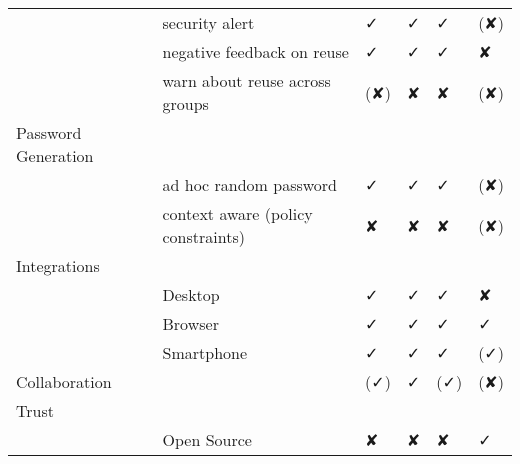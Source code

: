\begin{table}[htbp]
{\begin{tabular}{rlllll}
	& security alert & ✓ & ✓ & ✓ & (✘) \\
	& negative feedback on reuse & ✓ & \textcolor[rgb]{ 1,  0,  0}{✓} & \textcolor[rgb]{ 1,  0,  0}{✓} & ✘\\
	& warn about reuse across groups & (✘)   & \textcolor[rgb]{ 1,  0,  0}{✘} & \textcolor[rgb]{ 1,  0,  0}{✘} & (✘) \\
	\multicolumn{1}{l}{Password Generation} &       &       &       &       &  \\
	& ad hoc random password & ✓ & ✓ & ✓ & (✘) \\
	& context aware (policy constraints) & ✘ & ✘ & ✘ & (✘) \\
	\multicolumn{1}{l}{Integrations} &       &       &       &       &  \\
	& Desktop  & ✓ & ✓ & ✓ & ✘\\
	& Browser & ✓ & ✓ & ✓ & ✓\\
	& Smartphone & ✓ & ✓ & ✓ & (✓) \\
	\multicolumn{1}{l}{Collaboration} &       & (✓)   & ✓ & (✓)   & (✘) \\
	\multicolumn{1}{l}{Trust} &       &       &       &       &  \\
	& Open Source & ✘ & ✘ & ✘ & ✓\\
\end{tabular}%
}%
\end{table}%
